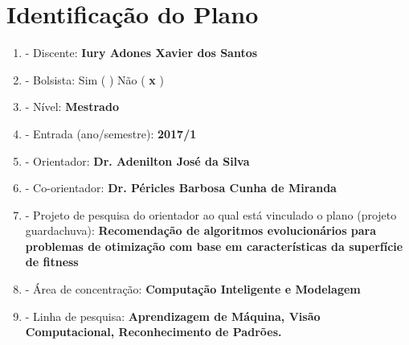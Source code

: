 \documentclass[12pt,a4paper,oneside]{book}
\newcommand\wb[1]{\discretionary{#1}{#1}{#1}}
\begin{document}

\thispagestyle{empty}
\frontmatter
\tableofcontents
\pagebreak
\chapter*{Identifica\c{c}\~{a}o do Plano}
\renewcommand{\labelenumi}{\alph{enumi}}
\begin{enumerate}
    \item - Discente: \textbf{Iury Adones Xavier dos Santos}
    \item - Bolsista: Sim ( )  N\~{a}o ( \textbf{x} )
    \item - N\'{i}vel: \textbf{Mestrado}
    \item - Entrada (ano/semestre): \textbf{2017/1}
    \item - Orientador: \textbf{Dr. Adenilton Jos\'{e} da Silva}
    \item - Co-orientador: \textbf{Dr. P\'{e}ricles Barbosa Cunha de Miranda}
    \item - Projeto de pesquisa do orientador ao qual est\'{a} vinculado o plano
        (projeto guarda\wb-chuva): \textbf{Recomenda\c{c}\~{a}o de algoritmos
        evolucion\'{a}rios para problemas de otimiza\c{c}\~{a}o com base em
        caracter\'{i}sticas da superf\'{i}cie de fitness}
    \item - \'{A}rea de concentra\c{c}\~{a}o: \textbf{Computa\c{c}\~{a}o
        Inteligente e Modelagem}
    \item - Linha de pesquisa: \textbf{Aprendizagem de M\'{a}quina, Vis\~{a}o
        Computacional, Reconhecimento de Padr\~{o}es.}
\end{enumerate}
\renewcommand{\labelenumi}{\arabic{enumi}}
\pagebreak
\mainmatter
\end{document}
